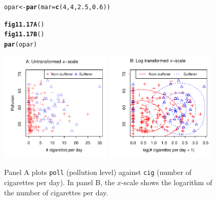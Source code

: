 \documentclass[12pt, a4paper,  BCOR=8.25mm, DIV=15]{scrartcl}\usepackage[]{graphicx}\usepackage[]{color}
\makeatletter
\newcommand{\hlnum}[1]{\textcolor[rgb]{0.686,0.059,0.569}{#1}}%
\newcommand{\hlstd}[1]{\textcolor[rgb]{0.345,0.345,0.345}{#1}}%
\newcommand{\hlkwb}[1]{\textcolor[rgb]{0.69,0.353,0.396}{#1}}%
\newcommand{\hlkwc}[1]{\textcolor[rgb]{0.333,0.667,0.333}{#1}}%
\newcommand{\hlkwd}[1]{\textcolor[rgb]{0.737,0.353,0.396}{\textbf{#1}}}%
\newenvironment{kframe}{%
 \def\at@end@of@kframe{}%
 \ifinner\ifhmode%
  \def\at@end@of@kframe{\end{minipage}}%
  \begin{minipage}{\columnwidth}%
 \fi\fi%
 \def\FrameCommand##1{\hskip\@totalleftmargin \hskip-\fboxsep
 \colorbox{shadecolor}{##1}\hskip-\fboxsep
     \hskip-\linewidth \hskip-\@totalleftmargin \hskip\columnwidth}%
 \MakeFramed {\advance\hsize-\width
   \@totalleftmargin\z@ \linewidth\hsize
   \@setminipage}}%
 {\par\unskip\endMakeFramed%
 \at@end@of@kframe}
\newenvironment{knitrout}{}{} %
\newcommand{\txtt}[1]{{\texttt{#1}}}
\makeatother
\begin{document}
\begin{figure}[H]
\begin{knitrout}
\color{fgcolor}\begin{kframe}
\begin{alltt}
\hlstd{opar} \hlkwb{<-} \hlkwd{par}\hlstd{(}\hlkwc{mar}\hlstd{=}\hlkwd{c}\hlstd{(}\hlnum{4}\hlstd{,}\hlnum{4}\hlstd{,}\hlnum{2.5}\hlstd{,}\hlnum{0.6}\hlstd{))}

\hlkwd{fig11.17A}\hlstd{()}
\hlkwd{fig11.17B}\hlstd{()}
\hlkwd{par}\hlstd{(opar)}
\end{alltt}
\end{kframe}

{\centering \includegraphics[width=0.47\textwidth]{figs/reg-bronchitAB-1} 
\includegraphics[width=0.47\textwidth]{figs/reg-bronchitAB-2} 

}



\end{knitrout}
\caption{Panel A plots \txtt{poll} (pollution level) against
  \txtt{cig} (number of cigarettes per day).  In panel B, the
  $x$-scale shows the logarithm of the number of cigarettes per
  day.\label{fig:cig-poll}}
\end{figure}
\end{document}
